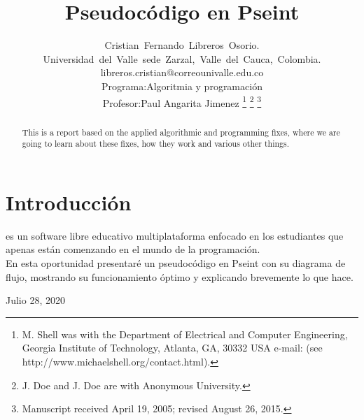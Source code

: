 \documentclass[journal]{IEEEtran}
\begin{document}
\title{Pseudocódigo en Pseint}


\author{Cristian~Fernando~Libreros~Osorio.\\Universidad~del~Valle~sede~Zarzal,~Valle~del~Cauca,~Colombia.\\libreros.cristian@correounivalle.edu.co\\Programa:Algoritmia y programación\\Profesor:Paul Angarita Jimenez
\thanks{M. Shell was with the Department
of Electrical and Computer Engineering, Georgia Institute of Technology, Atlanta,
GA, 30332 USA e-mail: (see http://www.michaelshell.org/contact.html).}
\thanks{J. Doe and J. Doe are with Anonymous University.}
\thanks{Manuscript received April 19, 2005; revised August 26, 2015.}}


\maketitle


\begin{abstract}
This is a report based on the applied algorithmic and programming fixes, where we are going to learn about these fixes, how they work and various other things.
\end{abstract}








\IEEEpeerreviewmaketitle



\section{Introducción}

 es un software libre educativo multiplataforma enfocado en los estudiantes que apenas están comenzando en el mundo de la programación.\\
En esta oportunidad presentaré un pseudocódigo en Pseint con su diagrama de flujo, mostrando su funcionamiento óptimo y explicando brevemente lo que hace.




 
\hfill Julio 28, 2020
\end{document}
